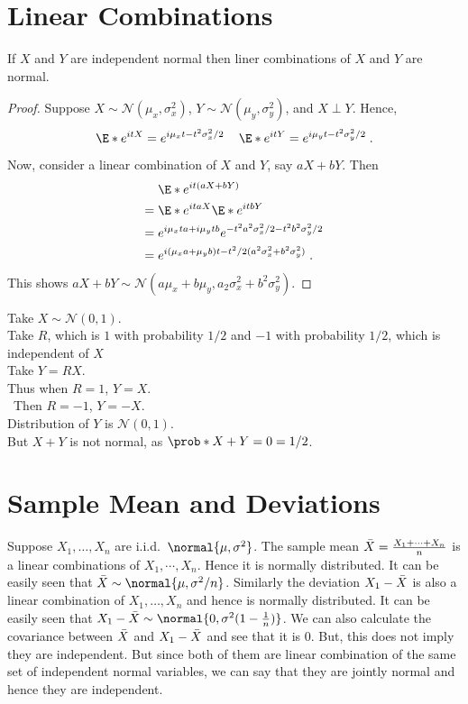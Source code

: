 \section{Linear Combinations}

\begin{proposition}
If $X$ and $Y$ are independent normal then liner combinations of $X$ and $Y$ are normal.     
\end{proposition}

\begin{proof}
Suppose $X\sim\mathcal{N}(\mu_x,\sigma_x^2)$, 
$Y\sim\mathcal{N}(\mu_y,\sigma_y^2)$, and
$X\perp Y$. Hence,
\[
\E*{e^{itX}}=e^{i\mu_x t - t^2\sigma_x^2/2}\,\quad
\E*{e^{itY}}=e^{i\mu_y t - t^2\sigma_y^2/2}\;.
\]
Now, consider a linear combination of $X$ and $Y$, say $aX+bY$. Then
\begin{align*}
& \E*{e^{it(aX+bY)}} \\
={} & \E*{e^{itaX}}\E*{e^{itbY}} \\
={} & e^{i \mu_x t a + i \mu_y t b} 
e^{ - t^2 a^2 \sigma_x^2/2 - t^2 b^2 \sigma_y^2 / 2} \\
={} & e^{i (\mu_x a + \mu_y b) t - t^2/2 (a^2\sigma_x^2+b^2\sigma_y^2)} \;.
\end{align*}
This shows $aX+bY\sim\mathcal{N}(a\mu_x+b\mu_y,a_2\sigma_x^2+b^2\sigma_y^2)$.
\end{proof}

\begin{example}
Take $X\sim\mathcal{N}(0,1)$.\\
Take $R$, which is $1$ with probability $1/2$ and $-1$ with probability $1/2$, which is independent of $X$\\
Take $Y = RX$.\\
Thus when $R=1$, $Y=X$.\\\
Then $R=-1$, $Y=-X$.\\
Distribution of $Y$ is $\mathcal{N}(0,1)$.\\
But $X+Y$ is not normal, as $\prob*{X+Y=0}=1/2$.
\end{example}


\section{Sample Mean and Deviations}

Suppose $X_1,\ldots,X_n$ are i.i.d.\ 
$\normal{\mu,\sigma^2}$. The sample mean 
$
\Bar{X} = \frac{X_1+\cdots+X_n}{n}
$
is a linear combinations of $X_1,\cdots,X_n$. Hence it is normally distributed. It can be easily seen that $\Bar{X}\sim\normal{\mu,\sigma^2/n}$. Similarly the deviation $X_1-\Bar{X}$ is also a linear combination of $X_1,\ldots,X_n$ and hence is normally distributed. It can be easily seen that $X_1-\Bar{X}\sim\normal{0,\sigma^2(1-\frac{1}{n})}$. We can also calculate the covariance between $\Bar{X}$ and $X_1-\Bar{X}$ and see that it is $0$. But, this does not imply they are independent. But since both of them are linear combination of the same set of independent normal variables, we can say that they are jointly normal and hence they are independent.


